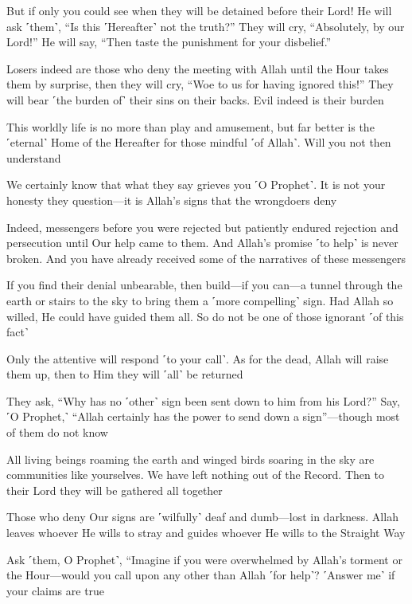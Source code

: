 But if only you could see when they will be detained before their Lord! He will ask ˹them˺, “Is this ˹Hereafter˺ not the truth?” They will cry, “Absolutely, by our Lord!” He will say, “Then taste the punishment for your disbelief.”

Losers indeed are those who deny the meeting with Allah until the Hour takes them by surprise, then they will cry, “Woe to us for having ignored this!” They will bear ˹the burden of˺ their sins on their backs. Evil indeed is their burden

This worldly life is no more than play and amusement, but far better is the ˹eternal˺ Home of the Hereafter for those mindful ˹of Allah˺. Will you not then understand

We certainly know that what they say grieves you ˹O Prophet˺. It is not your honesty they question—it is Allah’s signs that the wrongdoers deny

Indeed, messengers before you were rejected but patiently endured rejection and persecution until Our help came to them. And Allah’s promise ˹to help˺ is never broken. And you have already received some of the narratives of these messengers

If you find their denial unbearable, then build—if you can—a tunnel through the earth or stairs to the sky to bring them a ˹more compelling˺ sign. Had Allah so willed, He could have guided them all. So do not be one of those ignorant ˹of this fact˺

Only the attentive will respond ˹to your call˺. As for the dead, Allah will raise them up, then to Him they will ˹all˺ be returned

They ask, “Why has no ˹other˺ sign been sent down to him from his Lord?” Say, ˹O Prophet,˺ “Allah certainly has the power to send down a sign”—though most of them do not know

All living beings roaming the earth and winged birds soaring in the sky are communities like yourselves. We have left nothing out of the Record. Then to their Lord they will be gathered all together

Those who deny Our signs are ˹wilfully˺ deaf and dumb—lost in darkness. Allah leaves whoever He wills to stray and guides whoever He wills to the Straight Way

Ask ˹them, O Prophet˺, “Imagine if you were overwhelmed by Allah’s torment or the Hour—would you call upon any other than Allah ˹for help˺? ˹Answer me˺ if your claims are true

